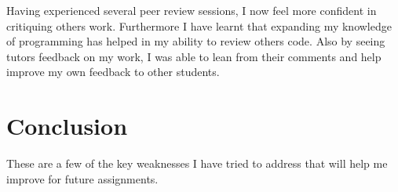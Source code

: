 \documentclass{scrartcl}
\begin{document}
Having experienced several peer review sessions, I now feel more confident in critiquing others work. Furthermore I have learnt that expanding my knowledge of programming has helped in my ability to review others code.
Also by seeing tutors feedback on my work, I was able to lean from their comments and help improve my own feedback to other students.

\section{Conclusion}
These are a few of the key weaknesses I have tried to address that will help me improve for future assignments.
\end{document}
